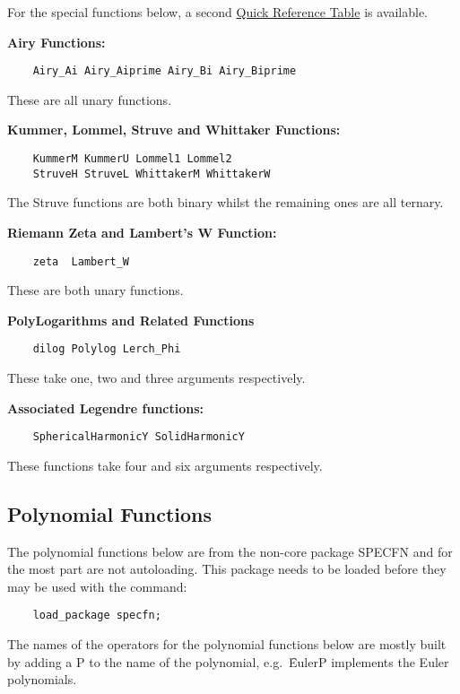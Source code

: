 For the special functions below, a second
\hyperlink{SPECFNTAB2}{Quick Reference Table} is available.

\textbf{Airy Functions:}
\begin{verbatim}
    Airy_Ai Airy_Aiprime Airy_Bi Airy_Biprime
\end{verbatim}
These are all unary functions.

\textbf{Kummer, Lommel, Struve and Whittaker Functions:}
\begin{verbatim}
    KummerM KummerU Lommel1 Lommel2
    StruveH StruveL WhittakerM WhittakerW
\end{verbatim}
The Struve functions are both binary whilst the remaining ones are all ternary.

 
\textbf{Riemann Zeta and Lambert's W Function:}
\begin{verbatim}
    zeta  Lambert_W
\end{verbatim}
These are both unary functions.

 
\textbf{PolyLogarithms and Related Functions}
\nopagebreak
\begin{verbatim}
    dilog Polylog Lerch_Phi
\end{verbatim}
These take one, two and three arguments respectively.

\textbf{Associated Legendre functions:}
\begin{verbatim}
    SphericalHarmonicY SolidHarmonicY
\end{verbatim}
These functions take four and six arguments respectively.

\subsection{Polynomial Functions}
The polynomial functions below are from the non-core package SPECFN
and for the most part are not autoloading. This package needs to be loaded
before they may be used with the command:
\begin{verbatim}
    load_package specfn;
\end{verbatim}
The names of the {\REDUCE} operators for the polynomial functions below
are mostly built by adding a P to the name of the polynomial,
e.g.\ \f{EulerP} implements the Euler polynomials.

